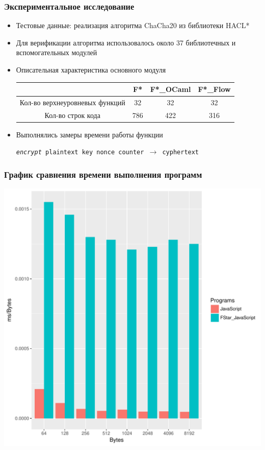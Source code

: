 \documentclass{beamer}
\begin{document}
\begin{frame}
\transwipe[direction=90]
\frametitle{Экспериментальное исследование}

\begin{itemize}
\item Тестовые данные: реализация алгоритма ChaCha20 из библиотеки HACL*
\item Для верификации алгоритма использовалось около 37 библиотечных и вспомогательных модулей

\item Описательная характеристика основного модуля
\begin{tabular}{ | c | c | c | c | }
\hline
& F* & F*\_OCaml & F*\_Flow \\ \hline
Кол-во верхнеуровневых функций & 32 & 32 & 32 \\ \hline
Кол-во строк кода & 786 & 422 & 316 \\
\hline
\end{tabular}

\item Выполнялись замеры времени работы функции 

\texttt{\textit{encrypt} plaintext key nonce counter $\to$ cyphertext}

\end{itemize}

\end{frame}

\begin{frame}
\transwipe[direction=90]
\frametitle{График сравнения времени выполнения программ}

\begin{center}
 \includegraphics[width=.65\linewidth]{Comparison}
\end{center}

\end{frame}
\end{document}
